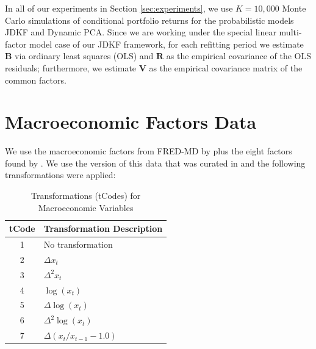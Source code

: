 \documentclass[11pt]{article}
\theoremstyle{plain}
\theoremstyle{definition}
\theoremstyle{remark}
\numberwithin{equation}{section}
\begin{document}
In all of our experiments in Section \ref{sec:experiments}, we use $K=10,000$ Monte Carlo simulations of conditional portfolio returns for the probabilistic models JDKF and Dynamic PCA. Since we are working under the special linear multi-factor model case of our JDKF framework, for each refitting period we estimate $\mathbf{B}$ via ordinary least squares (OLS) and $\mathbf{R}$ as the empirical covariance of the OLS residuals; furthermore, we estimate $\mathbf{V}$ as the empirical covariance matrix of the common factors.

\section{Macroeconomic Factors Data}
\label{sec:appe}
\setcounter{table}{0}
\setcounter{figure}{0}
\renewcommand{\thetable}{G.\arabic{table}}
\renewcommand{\thefigure}{G.\arabic{figure}}

We use the macroeconomic factors from FRED-MD by \citet{mccracken2016fred} plus the eight factors found by \citet{goyal2008comprehensive}. We use the version of this data that was curated in \citet{chen2020internet} and the following transformations were applied: 

\begin{table}[htbp]
\centering
\caption{Transformations (tCodes) for Macroeconomic Variables}
\begin{tabular}{|c|l|}
\hline
\textbf{tCode} & \textbf{Transformation Description} \\ \hline
1 & No transformation \\ \hline
2 & \(\Delta x_t\) \\ \hline
3 & \(\Delta^2 x_t\) \\ \hline
4 & \(\log(x_t)\) \\ \hline
5 & \(\Delta \log(x_t)\) \\ \hline
6 & \(\Delta^2 \log(x_t)\) \\ \hline
7 & \(\Delta(x_t/x_{t-1} - 1.0)\) \\ \hline
\end{tabular}
\label{tab:tcode_transformations}
\end{table}
\end{document}
